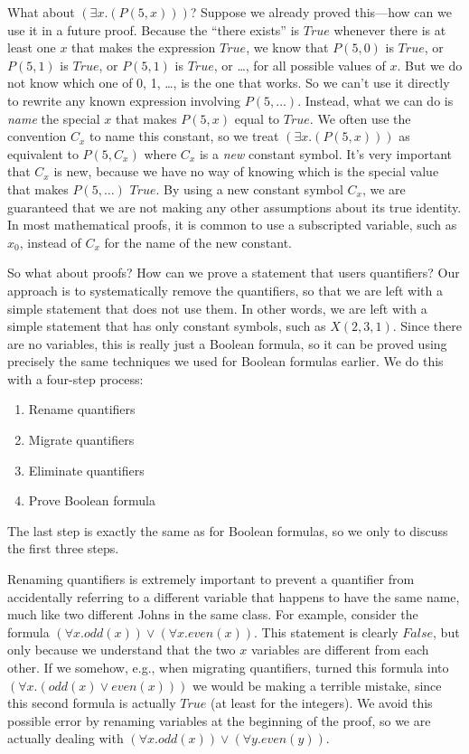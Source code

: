 {{What about $(\exists x.(P(5, x)))$? Suppose we already proved this---how can we use it in a future proof. Because
the ``there exists'' is $True$ whenever there is at least one $x$ that makes the expression $True$, we know that
$P(5, 0)$ is $True$, or $P(5, 1)$ is $True$, or $P(5, 1)$ is $True$, or \dots, for all possible values of $x$. But
we do not know which one of 0, 1, \dots, is the one that works. So we can't use it directly to rewrite any known
expression involving $P(5, \dots)$. Instead, what we can do is \emph{name} the special $x$ that makes $P(5, x)$
equal to $True$. We often use the convention $C_x$ to name this constant, so we treat $(\exists x.(P(5, x)))$ as
equivalent to $P(5, C_x)$ where $C_x$ is a \emph{new} constant symbol. It's very important that $C_x$ is new, because
we have no way of knowing which is the special value that makes $P(5, \dots)$ $True$. By using a new constant
symbol $C_x$, we are guaranteed that we are not making any other assumptions about its true identity. In most
mathematical proofs, it is common to use a subscripted variable, such as $x_0$, instead of $C_x$ for the name
of the new constant.

So what about proofs? How can we prove a statement that users quantifiers? Our approach is to systematically
remove the quantifiers, so that we are left with a simple statement that does not use them. In other words, we
are left with a simple statement that has only constant symbols, such as $X(2, 3, 1)$. Since there are no variables,
this is really just a Boolean formula, so it can be proved using precisely the same techniques we used for Boolean 
formulas earlier. We do this with a four-step process:
\begin{enumerate}
    \item Rename quantifiers
    \item Migrate quantifiers
    \item Eliminate quantifiers
    \item Prove Boolean formula
\end{enumerate}
The last step is exactly the same as for Boolean formulas, so we only to discuss the first three steps.

Renaming quantifiers is extremely important to prevent a quantifier from accidentally referring to a different variable
that happens to have the same name, much like two different Johns in the same class. For example, consider the formula 
$(\forall x.odd(x)) \vee (\forall x.even(x))$. This
statement is clearly $False$, but only because we understand that the two $x$ variables are different from each other. If
we somehow, e.g., when migrating quantifiers, turned this formula into $(\forall x.(odd(x) \vee even(x)))$ we would be
making a terrible mistake, since this second formula is actually $True$ (at least for the integers). We avoid this possible
error by renaming variables at the beginning of the proof, so we are actually dealing with $(\forall x.odd(x)) \vee (\forall y.even(y))$.

}}
